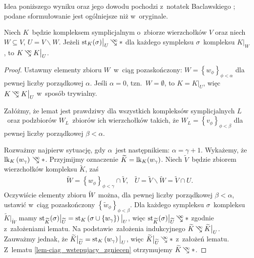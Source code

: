 Idea poniższego wyniku oraz jego dowodu pochodzi z~notatek Baclawskiego \cite{Baclawski}; podane  sformułowanie jest ogólniejsze niż w~oryginale.
\begin{lem}\label{lem-prop62-Baclawskiego}
Niech $K$~będzie kompleksem symplicjalnym o~zbiorze wierzchołków $V$ oraz niech $W\subseteq V$, $U=V\smallsetminus W$. Jeżeli $\st_K(\sigma)\big|_U\infcoll *$ dla każdego sympleksu $\sigma$~kompleksu $K\big|_W$, to $K\infcoll K\big|_U$.
\end{lem}
\begin{proof}
Ustawmy elementy zbioru $W$~w~ciąg pozaskończony: $W=\left\{w_\phi\right\}_{\phi<\alpha}$ dla pewnej liczby porządkowej $\alpha$. Jeśli $\alpha=0$, tzn.~$W=\emptyset$, to $K=K\big|_U$, więc $K\infcoll K\big|_U$ w~sposób trywialny.

Załóżmy, że lemat jest prawdziwy dla wszystkich kompleksów symplicjalnych $L$~oraz podzbiorów $W_L$~zbiorów ich wierzchołków takich, że $W_L=\left\{v_\phi\right\}_{\phi<\beta}$ dla pewnej liczby porządkowej $\beta<\alpha$.

Rozważmy najpierw sytuację, gdy $\alpha$~jest następnikiem: $\alpha=\gamma+1$. Wykażemy, że $\lk_K\left(w_\gamma\right)\infcoll *$. Przyjmijmy  oznaczenie $\widetilde{K}=\operatorname{lk}_K(w_\gamma)$. Niech $\widetilde{V}$~będzie zbiorem wierzchołków kompleksu $\widetilde{K}$, zaś \begin{align*}&\widetilde{W}=\left\{w_\phi\right\}_{\phi<\gamma}\cap \widetilde{V},& \widetilde{U}=\widetilde{V}\smallsetminus \widetilde{W}=\widetilde{V}\cap U.\end{align*} Oczywiście elementy zbioru $\widetilde{W}$~można, dla pewnej liczby porządkowej $\beta<\alpha$, ustawić w~ciąg pozaskończony $\left\{\widetilde{w}_\phi\right\}_{\phi<\beta}$. Dla każdego sympleksu $\sigma$~kompleksu $\widetilde{K}\big|_{\widetilde{W}}$ mamy $\operatorname{st}_{\widetilde{K}}(\sigma)\big|_{\widetilde{U}}=\operatorname{st}_K\left(\sigma\cup\left\{w_\gamma\right\}\right)\big|_U$, więc $\st_{\widetilde{K}}(\sigma)\big|_{\widetilde{U}}\infcoll *$ zgodnie z~założeniami lematu. Na podstawie~założenia indukcyjnego $\widetilde{K}\infcoll \widetilde{K}\big|_U$. Zauważmy jednak, że $\widetilde{K}\big|_{\widetilde{U}}=\operatorname{st}_K\left(w_\gamma\right)\big|_U$, więc $\widetilde{K}\big|_{\widetilde{U}}\infcoll *$ z~założeń lematu. Z~lematu \ref{lem-ciag_wstepujacy_zgniecen} otrzymujemy $\widetilde{K}\infcoll *$. 


\end{proof}
